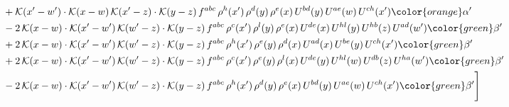 \begin{align}
&+\mathcal{K}(x'-w')\cdot\mathcal{K}(x-w)\,\mathcal{K}(x'-z)\cdot\mathcal{K}(y-z)\, f^{abc}\,\rho^{h}(x')\,\rho^{d}(y)\,\rho^{e}(x)\,U^{bd}(y)\,U^{ae}(w)\,U^{ch}(x'){\color{orange} \alpha'}\notag \\ &-2\,\mathcal{K}(x-w)\cdot\mathcal{K}(x'-w')\,\mathcal{K}(w'-z)\cdot\mathcal{K}(y-z)\, f^{abc}\,\rho^{c}(x')\,\rho^{l}(y)\,\rho^{e}(x)\,U^{de}(x)\,U^{hl}(y)\,U^{hb}(z)\,U^{ad}(w'){\color{green} \beta'}\notag\\ & +2\,\mathcal{K}(x-w)\cdot\mathcal{K}(x'-w')\,\mathcal{K}(w'-z)\cdot\mathcal{K}(y-z)\, f^{abc}\,\rho^{h}(x')\,\rho^{e}(y)\,\rho^{d}(x)\,U^{ad}(x)\,U^{be}(y)\,U^{ch}(x'){\color{green} \beta'}\notag\\ & +2\,\mathcal{K}(x-w)\cdot\mathcal{K}(x'-w')\,\mathcal{K}(w'-z)\cdot\mathcal{K}(y-z)\, f^{abc}\,\rho^{c}(x')\,\rho^{e}(y)\,\rho^{l}(x)\,U^{de}(y)\,U^{hl}(w)\,U^{db}(z)\,U^{ha}(w'){\color{green} \beta'}\notag\\ &-2\,\mathcal{K}(x-w)\cdot\mathcal{K}(x'-w')\,\mathcal{K}(w'-z)\cdot\mathcal{K}(y-z)\, f^{abc}\,\rho^{h}(x')\,\rho^{d}(y)\,\rho^{e}(x)\,U^{bd}(y)\,U^{ae}(w)\,U^{ch}(x'){\color{green} \beta'}\Bigg] 
\end{align}     
